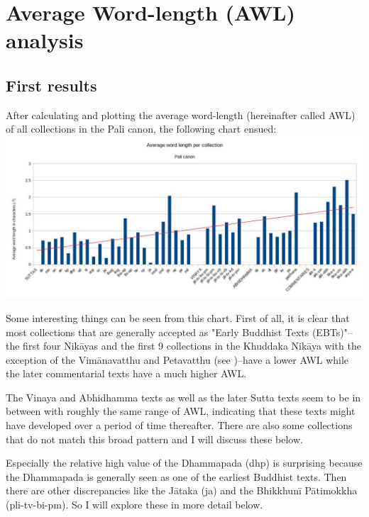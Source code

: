 \section{Average Word-length (AWL) analysis}
\subsection{First results}
After calculating and plotting the average word-length (hereinafter called AWL) of all collections in the Pali canon, the following chart ensued:\\

\includegraphics[width=\linewidth]{chart1.jpg}
\label{chart1}

\medskip
Some interesting things can be seen from this chart. First of all, it is clear that most collections that are generally accepted as "Early Buddhist Texts (EBTs)"--the first four Nikāyas and the first 9 collections in the Khuddaka Nikāya with the exception of the Vimānavatthu and Petavatthu (see \citep{sujatobrahmali})--have a lower AWL while the later commentarial texts have a much higher AWL.

The Vinaya and Abhidhamma texts as well as the later Sutta texts seem to be in between with roughly the same range of AWL, indicating that these texts might have developed over a period of time thereafter. There are also some collections that do not match this broad pattern and I will discuss these below.

Especially the relative high value of the Dhammapada (dhp) is surprising because the Dhammapada is generally seen as one of the earliest Buddhist texts. Then there are other discrepancies like the Jātaka (ja) and the Bhikkhunī Pātimokkha (pli-tv-bi-pm). So I will explore these in more detail below.

